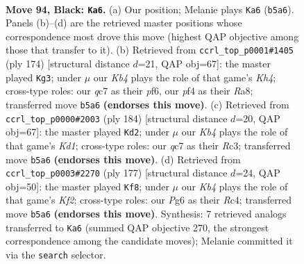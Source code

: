 \documentclass[11pt]{article}
\begin{document}
\clearpage

\begin{figure}[p]\centering
\begin{subfigure}{0.46\textwidth}\centering
\resizebox{\linewidth}{!}{%
\newchessgame
\chessboard[
  setfen={1R6/2Q5/6p1/1k3p2/5P2/5K2/8/8 b - - 8 94},
  showmover=false,
  pgfstyle=straightmove, color=movearrow, markmove={b5-a6}
]}
\caption{}
\end{subfigure}\hfill
\begin{subfigure}{0.46\textwidth}\centering
\resizebox{\linewidth}{!}{%
\newchessgame
\chessboard[
  setfen={R7/5k2/5p2/5P2/5P1K/8/8/7r w - - 5 88},
  showmover=false,
  pgfstyle=straightmove, color=movearrow, markmove={h4-g3}
]}
\caption{}
\end{subfigure}
\\[4pt]
\begin{subfigure}{0.46\textwidth}\centering
\resizebox{\linewidth}{!}{%
\newchessgame
\chessboard[
  setfen={8/8/5k2/5p2/5P2/2R1P3/8/r2K4 w - - 63 93},
  showmover=false,
  pgfstyle=straightmove, color=movearrow, markmove={d1-d2}
]}
\caption{}
\end{subfigure}\hfill
\begin{subfigure}{0.46\textwidth}\centering
\resizebox{\linewidth}{!}{%
\newchessgame
\chessboard[
  setfen={8/1R3k2/8/7p/2r5/6PK/8/8 b - - 19 89},
  showmover=false,
  pgfstyle=straightmove, color=movearrow, markmove={f7-f8}
]}
\caption{}
\end{subfigure}
\caption{\textbf{Move 94, Black: \texttt{Ka6}.} (a) Our position; Melanie plays \texttt{Ka6} (\texttt{b5a6}). Panels (b)--(d) are the retrieved master positions whose correspondence most drove this move (highest QAP objective among those that transfer to it). (b) Retrieved from \texttt{ccrl\_top\_p0001\#1405} (ply 174) [structural distance $d$=21, QAP obj=67]: the master played \texttt{Kg3}; under $\mu$ our \emph{Kb4} plays the role of that game's \emph{Kh4}; cross-type roles: our \emph{q}c7 as their \emph{p}f6, our \emph{p}f4 as their \emph{R}a8; transferred move \texttt{b5a6} \textbf{(endorses this move)}. (c) Retrieved from \texttt{ccrl\_top\_p0000\#2003} (ply 184) [structural distance $d$=20, QAP obj=67]: the master played \texttt{Kd2}; under $\mu$ our \emph{Kb4} plays the role of that game's \emph{Kd1}; cross-type roles: our \emph{q}c7 as their \emph{R}c3; transferred move \texttt{b5a6} \textbf{(endorses this move)}. (d) Retrieved from \texttt{ccrl\_top\_p0003\#2270} (ply 177) [structural distance $d$=24, QAP obj=50]: the master played \texttt{Kf8}; under $\mu$ our \emph{Kb4} plays the role of that game's \emph{Kf2}; cross-type roles: our \emph{P}g6 as their \emph{R}c4; transferred move \texttt{b5a6} \textbf{(endorses this move)}. Synthesis: 7 retrieved analogs transferred to \texttt{Ka6} (summed QAP objective 270, the strongest correspondence among the candidate moves); Melanie committed it via the \texttt{search} selector.}
\label{fig:thought-m187}
\end{figure}
\end{document}
